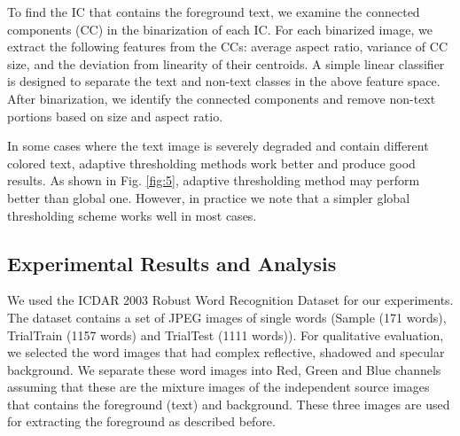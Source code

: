 To find the IC that contains the foreground text, we examine the connected components (CC) in the 
binarization of each IC. For each binarized image, we extract the following features from the CCs: 
average aspect ratio, variance of  CC size, and the deviation from linearity of their centroids.
A simple linear classifier is designed to separate the text and non-text classes in the above feature space.
After binarization, we identify the
connected components and remove non-text portions based on size and aspect ratio.

In some cases where the text image is severely degraded and contain different colored text,
adaptive thresholding methods work better and produce good results. As shown in Fig. \ref{fig:5}, adaptive thresholding
method may perform better than global one. However, in practice we note that a simpler global thresholding
scheme works well in most cases.

\subsection{Experimental Results and Analysis}

We used the ICDAR 2003 Robust Word Recognition Dataset \cite{A15} for our experiments.
The dataset contains a set of JPEG images of single words (Sample (171 words), 
TrialTrain (1157 words) and TrialTest (1111 words)). For qualitative evaluation,
we selected the word images that had complex reflective, shadowed and specular background.  
We separate these word images into Red, Green and Blue channels
assuming that these are the mixture images of the independent source images
that contains the foreground (text) and background. These three images are used
for extracting the foreground as described before.

